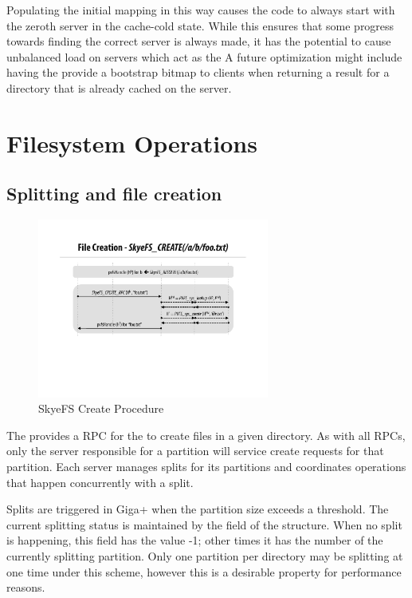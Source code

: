 \documentclass[onecolumn, 11pt, letterpaper]{article}
\begin{document}
Populating the initial mapping in this way causes the  code to
always start with the zeroth server in the cache-cold state.  While this
ensures that some progress towards finding the correct server is always made,
it has the potential to cause unbalanced load on servers which act as the
A future optimization might include having the  provide a
bootstrap bitmap to clients when returning a  result for a
directory that is already cached on the server.

\section{Filesystem Operations}
\subsection{Splitting and file creation}
\begin{figure}
\begin{center}
\includegraphics[width=3in]{figure-create}
\end{center}
\caption{SkyeFS Create Procedure}
\end{figure}
The  provides a  RPC for the
 to create files in a given directory.  As with all
 RPCs, only the server responsible for a partition will
service create requests for that partition.  Each server manages splits for
its partitions and coordinates operations that happen concurrently with a
split.

Splits are triggered in Giga+ when the partition size exceeds a threshold.
The current splitting status is maintained by the 
field of the  structure.  When no split is happening,
this field has the value -1; other times it has the number of the currently
splitting partition.  Only one partition per directory may be splitting at one
time under this scheme, however this is a desirable property for performance
reasons.
\end{document}
